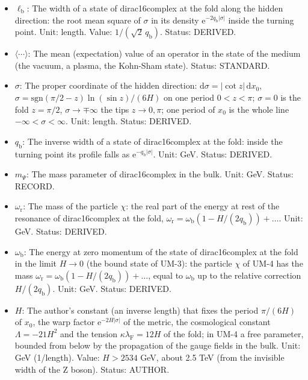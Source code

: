 \documentclass[
  10pt,
]{article}
\providecommand{\tightlist}{%
  \setlength{\itemsep}{0pt}\setlength{\parskip}{0pt}}
\begin{document}
\begin{itemize}
\tightlist
\item
  \(\ell_{\mathrm{b}}\): The width of a state of dirac16complex at the
  fold along the hidden direction: the root mean square of \(\sigma\) in
  its density \(\mathrm{e}^{-2q_{\mathrm{b}}\lvert\sigma\rvert}\) inside
  the turning point. Unit: length. Value:
  \(1/(\sqrt2\,q_{\mathrm{b}})\). Status: DERIVED.
\item
  \(\langle\cdots\rangle\): The mean (expectation) value of an operator
  in the state of the medium (the vacuum, a plasma, the Kohn-Sham
  state). Status: STANDARD.
\item
  \(\sigma\): The proper coordinate of the hidden direction:
  \(\mathrm{d}\sigma = \lvert\cot z\rvert\,\mathrm{d}x_0\),
  \(\sigma = \mathrm{sgn}(\pi/2 - z)\ln(\sin z)/(6H)\) on one period
  \(0 < z < \pi\); \(\sigma = 0\) is the fold \(z = \pi/2\),
  \(\sigma \to \mp\infty\) the tips \(z \to 0, \pi\); one period of
  \(x_0\) is the whole line \(-\infty < \sigma < \infty\). Unit: length.
  Status: DERIVED.
\item
  \(q_{\mathrm{b}}\): The inverse width of a state of dirac16complex at
  the fold: inside the turning point its profile falls as
  \(\mathrm{e}^{-q_{\mathrm{b}}\lvert\sigma\rvert}\). Unit: GeV. Status:
  DERIVED.
\item
  \(m_\Psi\): The mass parameter of dirac16complex in the bulk. Unit:
  GeV. Status: RECORD.
\item
  \(\omega_{\mathrm{r}}\): The mass of the particle \(\chi\): the real
  part of the energy at rest of the resonance of dirac16complex at the
  fold,
  \(\omega_{\mathrm{r}} = \omega_{\mathrm{b}}(1 - H/(2q_{\mathrm{b}})) + \dots\).
  Unit: GeV. Status: DERIVED.
\item
  \(\omega_{\mathrm{b}}\): The energy at zero momentum of the state of
  dirac16complex at the fold in the limit \(H \to 0\) (the bound state
  of UM-3): the particle \(\chi\) of UM-4 has the mass
  \(\omega_{\mathrm{r}} = \omega_{\mathrm{b}}(1 - H/(2q_{\mathrm{b}})) + \dots\),
  equal to \(\omega_{\mathrm{b}}\) up to the relative correction
  \(H/(2q_{\mathrm{b}})\). Unit: GeV. Status: DERIVED.
\item
  \(H\): The author's constant (an inverse length) that fixes the period
  \(\pi/(6H)\) of \(x_0\), the warp factor
  \(\mathrm{e}^{-2H\lvert\sigma\rvert}\) of the metric, the cosmological
  constant \(\Lambda = -21H^2\) and the tension
  \(\kappa\lambda_{\mathrm{F}} = 12H\) of the fold; in UM-4 a free
  parameter, bounded from below by the propagation of the gauge fields
  in the bulk. Unit: GeV (1/length). Value: \(H > 2534\) GeV, about 2.5
  TeV (from the invisible width of the Z boson). Status: AUTHOR.
\end{itemize}
\end{document}
